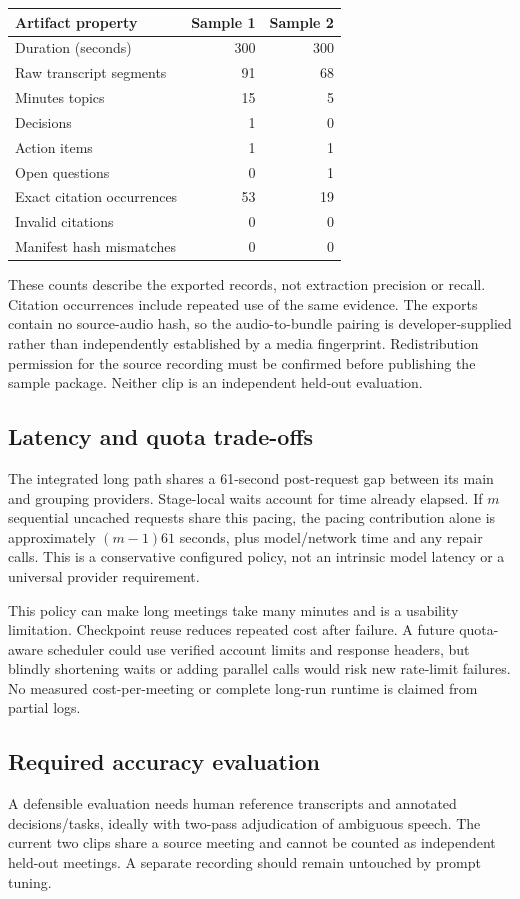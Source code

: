 \documentclass[11pt,a4paper]{article}
\begin{document}
\begin{tabularx}{\textwidth}{@{}Yrr@{}}\toprule
Artifact property & Sample 1 & Sample 2\\\midrule
Duration (seconds) & 300 & 300\\
Raw transcript segments & 91 & 68\\
Minutes topics & 15 & 5\\
Decisions & 1 & 0\\
Action items & 1 & 1\\
Open questions & 0 & 1\\
Exact citation occurrences & 53 & 19\\
Invalid citations & 0 & 0\\
Manifest hash mismatches & 0 & 0\\\bottomrule
\end{tabularx}

These counts describe the exported records, not extraction precision or recall. Citation occurrences include repeated use of the same evidence. The exports contain no source-audio hash, so the audio-to-bundle pairing is developer-supplied rather than independently established by a media fingerprint. Redistribution permission for the source recording must be confirmed before publishing the sample package. Neither clip is an independent held-out evaluation.

\subsection{Latency and quota trade-offs}
The integrated long path shares a 61-second post-request gap between its main and grouping providers. Stage-local waits account for time already elapsed. If $m$ sequential uncached requests share this pacing, the pacing contribution alone is approximately $(m-1)61$ seconds, plus model/network time and any repair calls. This is a conservative configured policy, not an intrinsic model latency or a universal provider requirement.

This policy can make long meetings take many minutes and is a usability limitation. Checkpoint reuse reduces repeated cost after failure. A future quota-aware scheduler could use verified account limits and response headers, but blindly shortening waits or adding parallel calls would risk new rate-limit failures. No measured cost-per-meeting or complete long-run runtime is claimed from partial logs.

\subsection{Required accuracy evaluation}
A defensible evaluation needs human reference transcripts and annotated decisions/tasks, ideally with two-pass adjudication of ambiguous speech. The current two clips share a source meeting and cannot be counted as independent held-out meetings. A separate recording should remain untouched by prompt tuning.
\end{document}
